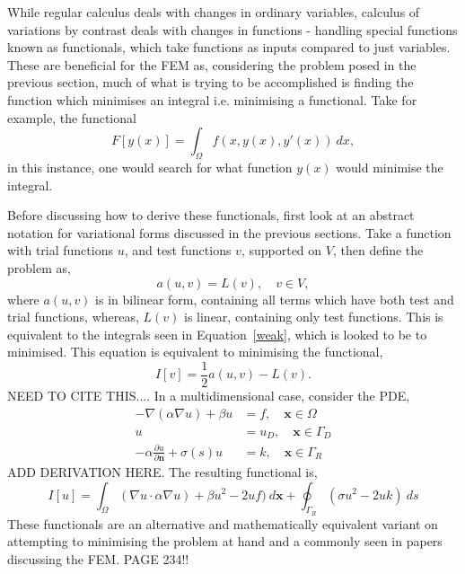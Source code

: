 While regular calculus deals with changes in ordinary variables, calculus of variations by contrast deals with changes in functions - handling special functions  known as functionals, which take functions as inputs compared to just variables. These are beneficial for the FEM as, considering the problem posed in the previous section, much of what is trying to be accomplished is finding the function which minimises an integral i.e. minimising a functional. Take for example, the functional 
\begin{equation}
	F[y(x)] = \int_\Omega f(x, y(x),y'(x))~dx,
\end{equation}
in this instance, one would search for what function $y(x)$ would minimise the integral.

Before discussing how to derive these functionals, first look at an abstract notation for variational forms discussed in the previous sections. Take a function with trial functions $u$, and test functions $v$, supported on $V$, then define the problem as,
\begin{equation}
	a(u,v) = L(v),\quad v\in V,
\end{equation}
where $a(u,v)$ is in bilinear form, containing all terms which have both test and trial functions, whereas, $L(v)$ is linear, containing only test functions. This is equivalent to the integrals seen in Equation~\eqref{weak}, which is looked to be to minimised. This equation is equivalent to minimising the functional,
\begin{equation}
	I[v] = \frac{1}{2}a(u,v) - L(v). 
\end{equation}
NEED TO CITE THIS....
In a multidimensional case, consider the PDE,
\begin{align}
	-\nabla(\alpha\nabla u) + \beta u &= f,\quad \mathbf{x} \in \Omega\\
	u &= u_D,\quad \mathbf{x} \in \Gamma_D\\
	-\alpha \frac{\partial u}{\partial \mathbf{n}} + \sigma(s) u &= k,\quad \mathbf{x}\in \Gamma_R	
\end{align}
ADD DERIVATION HERE.
The resulting functional is,
\begin{equation}
	I[u] = \int_\Omega (\nabla u\cdot \alpha \nabla u) + \beta u^2 - 2 u f)~d\mathbf{x} + \oint_{\Gamma_R} (\sigma u^2 - 2 u k)~ds
\end{equation}
These functionals are an alternative and mathematically equivalent variant on attempting to minimising the problem at hand and a commonly seen in papers discussing the FEM. 
PAGE 234!!

